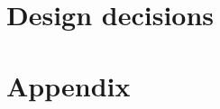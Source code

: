 \documentclass[11pt,fleqn]{book}
\begin{document}
 \part{Design decisions}
 \newpage
 




  
 \appendix 
 \part{Appendix}

  

 
 \newpage
 
 \newpage
 
 \newpage
 
 \newpage
 
 \newpage
 
\end{document}
